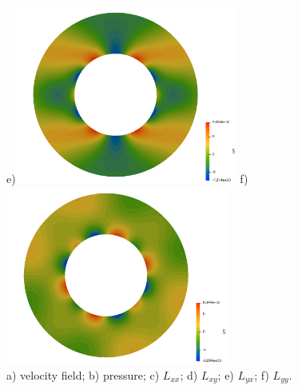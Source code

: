\begin{center}
e)\includegraphics[width=7.3cm]{python_codes/fieldstone_21/RESULTS/Lyx}
f)\includegraphics[width=7.3cm]{python_codes/fieldstone_21/RESULTS/Lyy}\\
{\captionfont a) velocity field; b) pressure; 
c) $L_{xx}$; 
d) $L_{xy}$; 
e) $L_{yx}$; 
f) $L_{yy}$.}
\end{center}
